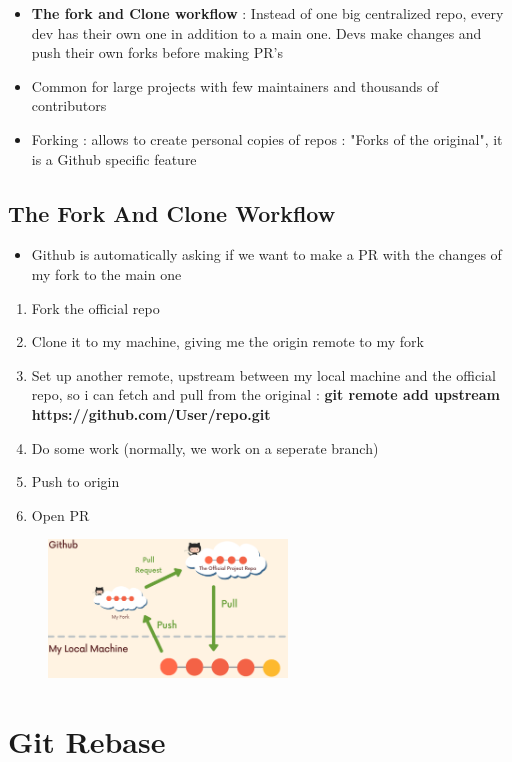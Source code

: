 \documentclass{report}
\begin{document}
\begin{itemize}
	\item \textbf{The fork and Clone workflow} : Instead of one big centralized repo, every dev has their own one in addition to a main one. Devs make changes and push their own forks before making PR's 
	\item Common for large projects with few maintainers and thousands of contributors 
	\item Forking : allows to create personal copies of repos : "Forks of the original", it is a Github specific feature
\end{itemize}

\section{The Fork And Clone Workflow}

\begin{itemize}
	\item Github is automatically asking if we want to make a PR with the changes of my fork to the main one 
\end{itemize}

\begin{enumerate}
	\item Fork the official repo 
	\item Clone it to my machine, giving me the origin remote to my fork 
	\item Set up another remote, upstream between my local machine and the official repo, so i can fetch and pull from the original : \textbf{git remote add upstream https://github.com/User/repo.git} 
	\item Do some work (normally, we work on a seperate branch)
	\item Push to origin 
	\item Open PR
\end{enumerate}
\begin{figure}[H] 
	 \centering 
	 \includegraphics[width=2.5in]{screenshots/2022-07-09T19-19-34Z.png} 
 \end{figure}

\chapter{Git Rebase}
\end{document}
